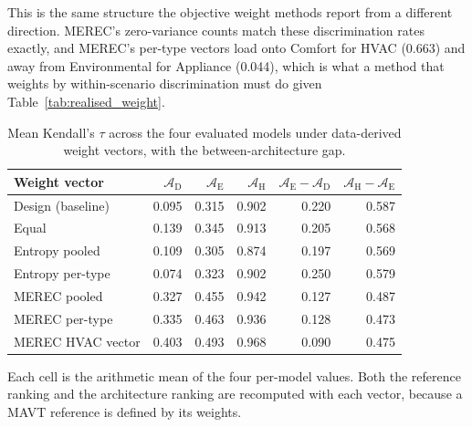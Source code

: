 This is the same structure the objective weight methods report from a different
direction. MEREC's zero-variance counts match these discrimination rates
exactly, and MEREC's per-type vectors load onto Comfort for HVAC (0.663) and
away from Environmental for Appliance (0.044), which is what a method that
weights by within-scenario discrimination must do given
Table~\ref{tab:realised_weight}.


\begin{table}[htbp]
\centering
\begin{threeparttable}
\footnotesize
\caption{Mean Kendall's $\tau$ across the four evaluated models under
data-derived weight vectors, with the between-architecture gap.}
\label{tab:sensitivity_pooled}
\begin{tabular}{@{}lrrrrr@{}}
\toprule
Weight vector & $\mathcal{A}_{\text{D}}$ & $\mathcal{A}_{\text{E}}$ & $\mathcal{A}_{\text{H}}$ & $\mathcal{A}_{\text{E}}-\mathcal{A}_{\text{D}}$ & $\mathcal{A}_{\text{H}}-\mathcal{A}_{\text{E}}$ \\
\midrule
Design (baseline)   & 0.095 & 0.315 & 0.902 & 0.220 & 0.587 \\
Equal               & 0.139 & 0.345 & 0.913 & 0.205 & 0.568 \\
\midrule
Entropy pooled      & 0.109 & 0.305 & 0.874 & 0.197 & 0.569 \\
Entropy per-type    & 0.074 & 0.323 & 0.902 & 0.250 & 0.579 \\
\midrule
MEREC pooled        & 0.327 & 0.455 & 0.942 & 0.127 & 0.487 \\
MEREC per-type      & 0.335 & 0.463 & 0.936 & 0.128 & 0.473 \\
MEREC HVAC vector   & 0.403 & 0.493 & 0.968 & 0.090 & 0.475 \\
\bottomrule
\end{tabular}
\begin{tablenotes}
\footnotesize
\item Each cell is the arithmetic mean of the four per-model values. Both the
reference ranking and the architecture ranking are recomputed with each vector,
because a MAVT reference is defined by its weights.
\end{tablenotes}
\end{threeparttable}
\end{table}

